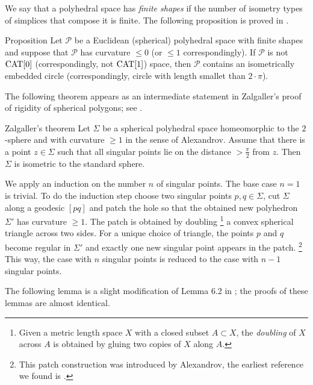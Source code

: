 \documentclass{compositio}
\begin{document}
We say that a polyhedral space has \emph{finite shapes} if the number of isometry types of
simplices that compose it is finite.
The following proposition is proved in  \cite[II. 4.17]{bridson-haefliger}.

\begin{thm}{Proposition}\label{geodesic2pi} Let $\mathcal P$ be a Euclidean  (spherical) polyhedral space  with
finite shapes and suppose that $\mathcal P$ has curvature $\le 0$ (or $\le 1$ correspondingly).
If $\mathcal P$ is not $\mathrm{CAT}[0]$ (correspondingly, not $\mathrm{CAT}[1]$) space, 
then $\mathcal P$ contains an isometrically embedded
circle (correspondingly, circle with length smallet than $2{\cdot}\pi$).
\end{thm}

The following theorem appears as an intermediate statement
in Zalgaller's proof of rigidity of spherical polygons;
see \cite{zalgaller}.

\begin{thm}{Zalgaller's theorem}\label{thm:rigid-sphere-2D}
Let $\Sigma$ be a spherical polyhedral space homeomorphic to the $2$-sphere
and with curvature $\ge 1$ in the sense of Alexandrov.
Assume that there is a point $z\in \Sigma$ such that all singular points lie
on the distance $>\tfrac\pi2$ from $z$.
Then $\Sigma$ is isometric to the standard sphere.

\end{thm}


We apply an induction on the number $n$ of singular points.
The base case $n=1$ is trivial.
To do the induction step
choose two singular points $p,q\in\Sigma$,
cut $\Sigma$ along a geodesic $[pq]$
and patch the hole so that the obtained new polyhedron $\Sigma'$ has curvature $\ge 1$.
The patch is obtained by doubling%
\footnote{Given a metric length space $X$ with a closed subset $A\subset X$,
the \emph{doubling} of $X$ across $A$ is obtained by gluing two copies of $X$ along $A$.}
 a convex spherical triangle across two sides.
For a unique choice of triangle, the points $p$ and $q$ become regular in $\Sigma'$
and exactly one new singular point appears in the patch.%
\footnote{This patch construction was introduced by Alexandrov,
the earliest reference we found is
\cite[VI, \S7]{alexandrov1948}.}
This way, the case with $n$ singular points is reduced to the case with $n-1$ singular points.
\qeds

The following lemma is a slight modification of Lemma 6.2 in \cite{allcock};
the proofs of these lemmas are almost identical.
\end{document}
